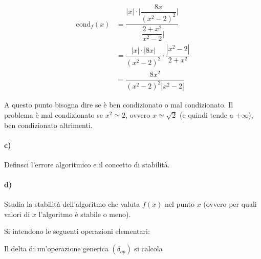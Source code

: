 \begin{equation*}
\begin{split}
  \mbox{cond}_f (x) & = \dfrac{|x|\cdot \Bigg| \dfrac{8x}{(x^2-2)^2}\Bigg|}{\Bigg| \dfrac{2+x^2}{x^2-2}\Bigg| }\\[1.5ex]
  & = \dfrac{|x|\cdot |8x|}{(x^2-2)^2} \cdot \dfrac{|x^2-2|}{2+x^2}\\[1.5ex]
  & = \dfrac{8x^2}{(x^2-2)^2|x^2-2|}
\end{split}
\end{equation*}

A questo punto bisogna dire se è ben condizionato o mal condizionato. Il problema è mal condizionato se $x^2\simeq 2$, ovvero $x\simeq \sqrt{2}$ (e quindi tende a $+\infty$), ben condizionato altrimenti.


\paragraph{c)} Definsci l'errore algoritmico e il concetto di stabilità.


\paragraph{d)} Studia la stabilità dell'algoritmo che valuta $f(x)$ nel punto $x$ (ovvero per quali valori di $x$ l'al\-go\-rit\-mo è stabile o meno).\medskip

Si intendono le seguenti operazioni elementari:

\begin{center}
\end{center}

Il delta di un'operazione generica $(\delta_{op})$ si calcola

